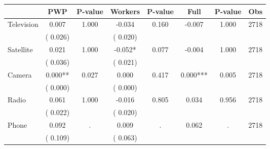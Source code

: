 
\begin{tabular}{l*{7}{c}}\hline&\multicolumn{1}{c}{PWP}&\multicolumn{1}{c}{P-value}&\multicolumn{1}{c}{Workers}&\multicolumn{1}{c}{P-value}&\multicolumn{1}{c}{Full}&\multicolumn{1}{c}{P-value}&\multicolumn{1}{c}{Obs} \\ \hline

 Television       &              0.007       &        1.000  &             -0.034       &        0.160  &             -0.007       &              1.000 &  2718 \\ 
                       &       (       0.026)             &                               &       (       0.020)                     &                               &                                               &                                &                      \\ 

 Satellite       &              0.021       &        1.000  &             -0.052*       &        0.077  &             -0.004       &              1.000 &  2718 \\ 
                       &       (       0.036)             &                               &       (       0.021)                     &                               &                                               &                                &                      \\ 

 Camera       &              0.000**       &        0.027  &              0.000       &        0.417  &              0.000***       &              0.005 &  2718 \\ 
                       &       (       0.000)             &                               &       (       0.000)                     &                               &                                               &                                &                      \\ 

 Radio       &              0.061       &        1.000  &             -0.016       &        0.805  &              0.034       &              0.956 &  2718 \\ 
                       &       (       0.022)             &                               &       (       0.020)                     &                               &                                               &                                &                      \\ 

 Phone       &              0.092       &            .  &              0.009       &            .  &              0.062       &                  . &  2718 \\ 
                       &       (       0.109)             &                               &       (       0.063)                     &                               &                                               &                                &                      \\ 

\hline \end{tabular}